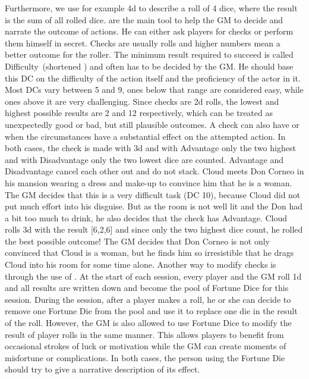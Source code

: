 Furthermore, we use for example 4d to describe a roll of 4 dice, where the result is the sum of all rolled dice.
 are the main tool to help the GM to decide and narrate the outcome of actions.
He can either ask players for checks or perform them himself in secret.
Checks are usually  rolls and higher numbers mean a better outcome for the roller. 
The minimum result required to succeed is called Difficulty~(shortened ) and often has to be decided by the GM.
He should base this DC on the difficulty of the action itself and the proficiency of the actor in it.
Most DCs vary between 5 and 9, ones below that range are considered easy, while ones above it are very challenging.
%
\ofpar
%
Since checks are 2d rolls, the lowest and highest possible results are 2 and 12 respectively, which can be treated as unexpectedly good or bad, but still plausible outcomes.
A check can also have  or  when the circumstances have a substantial effect on the attempted action. 
In both cases, the check is made with 3d and with Advantage only the two highest and with Disadvantage only the two lowest dice are counted. 
Advantage and Disadvantage cancel each other out and do not stack.
%
\clearpage
%
{
	Cloud meets Don Corneo in his mansion wearing a dress and make-up to convince him that he is a woman.
	The GM decides that this is a very difficult task (DC 10), because Cloud did not put much effort into his disguise. 
	But as the room is not well lit and the Don had a bit too much to drink, he also decides that the check has Advantage. 
	Cloud rolls 3d with the result [6,2,6] and since only the two highest dice count, he rolled the best possible outcome! 
	The GM decides that Don Corneo is not only convinced that Cloud is a woman, but he finds him so irresistible that he drags Cloud into his room for some time alone.
}
%
\ofpar
%
Another way to modify checks is through the use of .
At the start of each session, every player and the GM roll 1d and all results are written down and become the pool of Fortune Dice for this session.
During the session, after a player makes a roll, he or she can decide to remove one Fortune Die from the pool and use it to replace one die in the result of the roll.
However, the GM is also allowed to use Fortune Dice to modify the result of player rolls in the same manner.
This allows players to benefit from occasional strokes of luck or motivation while the GM can create moments of misfortune or complications.
In both cases, the person using the Fortune Die should try to give a narrative description of its effect.
